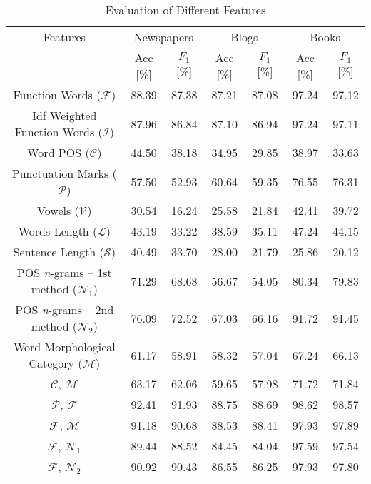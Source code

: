 \documentclass{llncs}
\begin{document}
\begin{table*}[htb]
\caption{Evaluation of Different Features}%
\centering
\begin{tabular}{c c c c c c c}%
\toprule%
Features & \multicolumn{2}{c}{Newspapers} & \multicolumn{2}{c}{Blogs} & \multicolumn{2}{c}{Books}\\ 
 & Acc [\%]\hspace{5pt} & $F_1$ [\%]\hspace{10pt} & Acc [\%]\hspace{5pt} & $F_1$ [\%]\hspace{10pt} & Acc [\%]\hspace{5pt} & $F_1$ [\%]\\
\midrule
Function Words ($\mathcal{F}$) & 88.39 & 87.38 & 87.21 & 87.08 & 97.24 & 97.12 \\
Idf Weighted Function Words ($\mathcal{I}$) & 87.96 & 86.84 & 87.10 & 86.94 & 97.24 & 97.11 \\
Word POS ($\mathcal{C}$) & 44.50 & 38.18 & 34.95 & 29.85 & 38.97 & 33.63 \\
Punctuation Marks ($\mathcal{P}$) & 57.50 & 52.93 & 60.64 & 59.35 & 76.55 & 76.31 \\
Vowels ($\mathcal{V}$) & 30.54 & 16.24 & 25.58 & 21.84 & 42.41 & 39.72 \\
Words Length ($\mathcal{L}$) & 43.19 & 33.22 & 38.59 & 35.11 & 47.24 & 44.15 \\
Sentence Length ($\mathcal{S}$) & 40.49 & 33.70 & 28.00 & 21.79 & 25.86 & 20.12 \\
POS \emph{n}-grams -- 1st method ($\mathcal{N}_1$) & 71.29 & 68.68 & 56.67 & 54.05 & 80.34 & 79.83 \\
POS \emph{n}-grams -- 2nd method ($\mathcal{N}_2$) & 76.09 & 72.52 & 67.03 & 66.16 & 91.72 & 91.45 \\
Word Morphological Category ($\mathcal{M}$) & 61.17 & 58.91 & 58.32 & 57.04 & 67.24 & 66.13 \\
$\mathcal{C}$, $\mathcal{M}$ & 63.17 & 62.06 & 59.65 & 57.98 & 71.72 & 71.84 \\
$\mathcal{P}$, $\mathcal{F}$ & 92.41 & 91.93 & 88.75 & 88.69 & 98.62 & 98.57 \\
$\mathcal{F}$, $\mathcal{M}$ & 91.18 & 90.68 & 88.53 & 88.41 & 97.93 & 97.89 \\
$\mathcal{F}$, $\mathcal{N}_1$ & 89.44 & 88.52 & 84.45 & 84.04 & 97.59 & 97.54 \\
$\mathcal{F}$, $\mathcal{N}_2$ & 90.92 & 90.43 & 86.55 & 86.25 & 97.93 & 97.80 \\

\end{tabular}
\end{table*}
\end{document}
